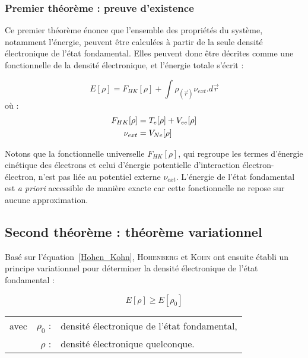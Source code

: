 \documentclass[12pt,a4paper]{book}
\begin{document}
	\subsubsection{Premier théorème : preuve d'existence}
	
	Ce premier théorème énonce que l'ensemble des propriétés du système, notamment l'énergie, peuvent être calculées à partir de la seule densité électronique de l'état fondamental. Elles peuvent donc être décrites comme une fonctionnelle de la densité électronique, et l'énergie totale s'écrit :
	
	\begin{equation}
	E[\rho] = F_{HK}[\rho] + \int \rho_{(\vec{r})} \nu_{ext} .d\vec{r}
	\label{Hohen_Kohn}
	\end{equation}
	\noindent où :
	\begin{align}
	F_{HK}[\rho] &= T_{e}[\rho] + V_{ee}[\rho] \\
	\nu_{ext} &= V_{Ne}[\rho] \notag
	\end{align}
	
	Notons que la fonctionnelle universelle $F_{HK}[\rho]$, qui regroupe les termes d'énergie cinétique des électrons et celui d'énergie potentielle d'interaction électron-électron, n'est pas liée au potentiel externe $\nu_{ext}$. L'énergie de l'état fondamental est \textit{a priori} accessible de manière exacte car cette fonctionnelle ne repose sur aucune approximation.
	
	\subsection{Second théorème : théorème variationnel}
	
	Basé sur l'équation~\ref{Hohen_Kohn}, \textsc{Hohenberg} et \textsc{Kohn} ont ensuite établi un principe variationnel pour déterminer la densité électronique de l'état fondamental :
	
	\begin{equation}
	E[\rho] \geq E[\rho_{0}]
	\end{equation}
	
	\begin{flushleft}
		\begin{tabular}{@{}lrp{10cm}}
			avec & $\rho_{0}$ : & densité électronique de l'état fondamental, \\
			& $\rho$ : & densité électronique quelconque.
		\end{tabular}
	\end{flushleft}
	
\end{document}
